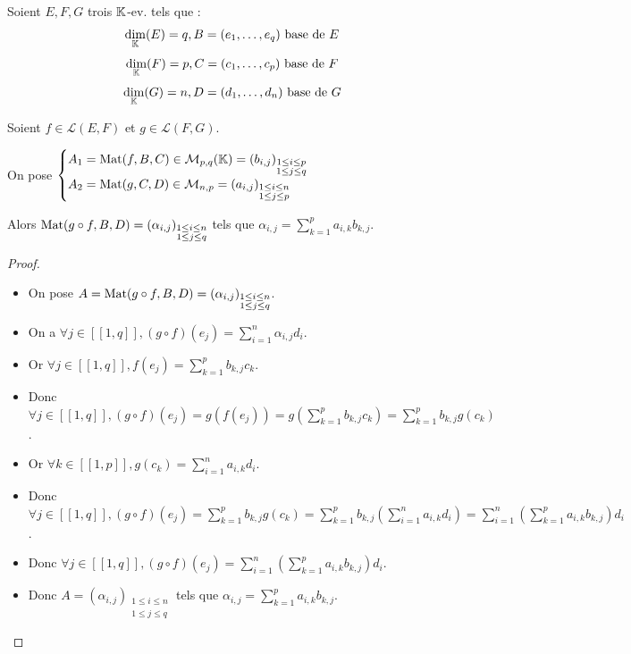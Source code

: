 \documentclass[12pt, a4paper]{report}
\begin{document}
\begin{property}
    Soient $E,F,G$ trois $\mathbb{K}$-ev. tels que :
    $$\underset{\mathbb{K}}\dim(E) = q, B = (e_1,\dots,e_q) \text{ base de } E$$
    $$\underset{\mathbb{K}}\dim(F) = p, C = (c_1,\dots,c_p) \text{ base de } F$$
    $$\underset{\mathbb{K}}\dim(G) = n, D = (d_1,\dots,d_n) \text{ base de } G$$

    Soient $f \in \mathcal L(E,F)$ et $g \in \mathcal L(F,G)$.

    On pose $\displaystyle\begin{cases} A_1 = \mathrm{Mat}(f,B,C) \in \mathcal M_{p,q}(\mathbb{K}) = (b_{i,j})_{\substack{1 \le i \le p \\ 1 \le j \le q}}\\
    A_2 = \mathrm{Mat}(g,C,D) \in \mathcal M_{n,p} = (a_{i,j})_{\substack{1 \le i \le n \\ 1 \le j \le p}}
    \end{cases}$

    Alors $\mathrm{Mat}(g \circ f, B, D) = (\alpha_{i,j})_{\substack{1 \le i \le n \\ 1 \le j \le q}}$ tels que $\alpha_{i,j} = \sum_{k=1}^p a_{i,k} b_{k,j}$.
\end{property}

\begin{proof}
\begin{itemize}
    \item On pose $A = \mathrm{Mat}(g \circ f, B, D) = (\alpha_{i,j})_{\substack{1 \le i \le n \\ 1 \le j \le q}}$.

    \item On a $\forall j \in [\![1,q]\!], (g \circ f)(e_j) = \sum_{i=1}^n \alpha_{i,j} d_i$.

    \item Or $\forall j \in [\![1,q]\!], f(e_j) = \sum_{k=1}^p b_{k,j} c_k$.

    \item Donc $\forall j \in [\![1,q]\!], (g \circ f)(e_j) = g(f(e_j)) = g\left(\sum_{k=1}^p b_{k,j} c_k\right) = \sum_{k=1}^p b_{k,j} g(c_k)$.

    \item Or $\forall k \in [\![1,p]\!], g(c_k) = \sum_{i=1}^n a_{i,k} d_i$.

    \item Donc $\forall j \in [\![1,q]\!], (g \circ f)(e_j) = \sum_{k=1}^p b_{k,j} g(c_k) = \sum_{k=1}^p b_{k,j} \left(\sum_{i=1}^n a_{i,k} d_i\right) = \sum_{i=1}^n \left(\sum_{k=1}^p a_{i,k} b_{k,j}\right) d_i$.

    \item Donc $\forall j \in [\![1,q]\!], (g \circ f)(e_j) = \sum_{i=1}^n \left(\sum_{k=1}^p a_{i,k} b_{k,j}\right) d_i$.

    \item Donc $A = (\alpha_{i,j})_{\substack{1 \le i \le n \\ 1 \le j \le q}}$ tels que $\alpha_{i,j} = \sum_{k=1}^p a_{i,k} b_{k,j}$.
\end{itemize}
\end{proof}
\end{document}
